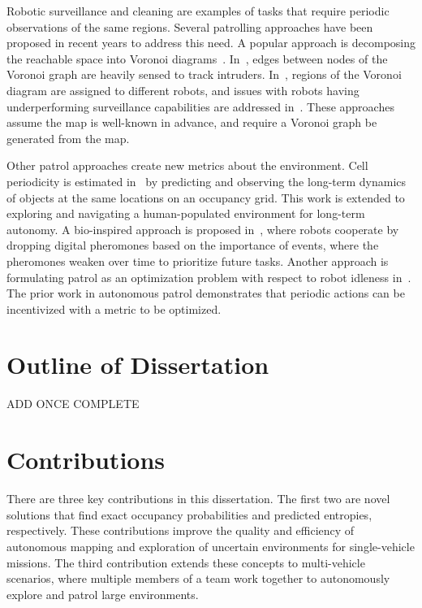 Robotic surveillance and cleaning are examples of tasks that require periodic observations of the same regions. Several patrolling approaches have been proposed in recent years to address this need. A popular approach is decomposing the reachable space into Voronoi diagrams~\cite{KolCar08,PorRoc10,PipChrWei13}. In~\cite{KolCar08}, edges between nodes of the Voronoi graph are heavily sensed to track intruders. In~\cite{PorRoc10}, regions of the Voronoi diagram are assigned to different robots, and issues with robots having underperforming surveillance capabilities are addressed in~\cite{PipChrWei13}. These approaches assume the map is well-known in advance, and require a Voronoi graph be generated from the map.

Other patrol approaches create new metrics about the environment. Cell periodicity is estimated in~\cite{KraFenCieDonDuc14,KraFenHanDuc16} by predicting and observing the long-term dynamics of objects at the same locations on an occupancy grid. This work is extended to exploring and navigating a human-populated environment for long-term autonomy. A bio-inspired approach is proposed in~\cite{ZhaXia11}, where robots cooperate by dropping digital pheromones based on the importance of events, where the pheromones weaken over time to prioritize future tasks. Another approach is formulating patrol as an optimization problem with respect to robot idleness in~\cite{YanZha16}. The prior work in autonomous patrol demonstrates that periodic actions can be incentivized with a metric to be optimized.


\section{Outline of Dissertation}

ADD ONCE COMPLETE

\section{Contributions}

There are three key contributions in this dissertation. The first two are novel solutions that find exact occupancy probabilities and predicted entropies, respectively. These contributions improve the quality and efficiency of autonomous mapping and exploration of uncertain environments for single-vehicle missions. The third contribution extends these concepts to multi-vehicle scenarios, where multiple members of a team work together to autonomously explore and patrol large environments.




